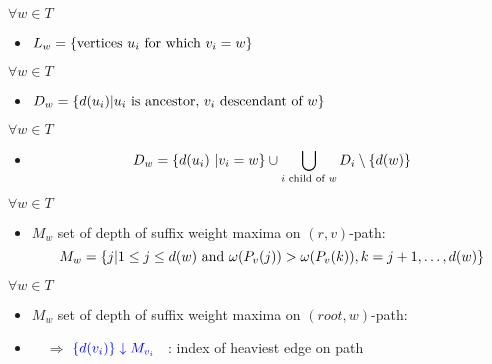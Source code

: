 \documentclass[18pt]{beamer}
\begin{document}
\begin{frame}
\begin{figure}
	\end{figure}

            \begin{overprint}
            	$\forall w \in T$
            	\begin{itemize}
            	\item $L_w = \{\textup{vertices }u_i \textup{ for which } v_i = w\}$
            	\end{itemize}
           		 $\forall w \in T$
           		 \begin{itemize}
            		\item $D_w = \{d(u_i) | u_i \textup{ is ancestor, } v_i \textup{ descendant of } w\}$
            	\end{itemize}
                $\forall w \in T$
                \begin{itemize}
                	\item \[D_w = \{d(u_i) \ | v_i = w\} \cup \bigcup_{i \textup{ child of } w } D_i \setminus \{d(w)\}\]
                \end{itemize}
            	$\forall w \in T$
            	\begin{itemize}
           		\item $M_w$ set of depth of suffix weight maxima on $(r,v)$-path:
           		\[
           		M_w = \{j | 1 \le j \le d(w) \textup{ and } \omega(P_v(j)) > \omega(P_v(k)), k = j+1, \dots, d(w)\}
           		\]
           		\end{itemize}
           	    $\forall w \in T$
           	    \begin{itemize}
           	    	\item $M_w$ set of depth of suffix weight maxima on $(root,w)$-path:
           	    	\item [] \ \ $\Rightarrow$ $\color{blue}\{d(v_i)\} \downarrow M_{v_i}$ \ : index of heaviest edge on path

\end{itemize}
\end{overprint}
\end{frame}
\end{document}
